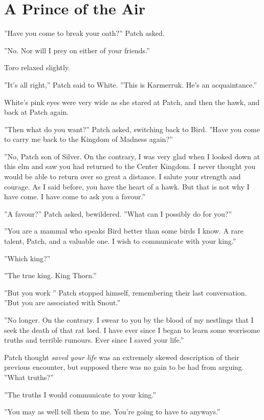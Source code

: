 \documentclass[12pt]{book}
\begin{document}
\section{A Prince of the Air}

 ''Have you come to break your oath?'' Patch asked.\par
 ''No. Nor will I prey on either of your friends.''\par
 Toro relaxed slightly.\par
 ''It's all right,'' Patch said to White. ''This is Karmerruk. He's %
 an acquaintance.''\par
 White's pink eyes were very wide as she stared at Patch, and then the hawk, and back at Patch again.\par
 ''Then what do you want?'' Patch asked, switching back to Bird. ''Have you come to carry me back to the Kingdom of Madness again?''\par
 ''No, Patch son of Silver. On the contrary, I was very glad when I looked down at this elm and saw you had returned to the Center Kingdom. I never thought you would be able to return over so great a distance. I salute your strength and courage. As I said before, you have the heart of a hawk. But that is not why I have come. I have come to ask you a favour.''\par
 ''A favour?'' Patch asked, bewildered. ''What can I possibly do for you?''\par
 ''You are a mammal who speaks Bird better than some birds I know. A rare talent, Patch, and a valuable one. I wish to communicate with your king.''\par
 ''Which king?''\par
 ''The true king. King Thorn.''\par
 ''But you work %
'' Patch stopped himself, remembering their last conversation. ''But you are associated with Snout.''\par
 ''No longer. On the contrary. I swear to you by the blood of my nestlings that I seek the death of that rat lord. I have ever since I began to learn some worrisome truths and terrible rumours. Ever since I saved your life.''\par
 Patch thought {\it saved your life} was an extremely skewed description of their previous encounter, but supposed there was no gain to be had from arguing. ''What truths?''\par
 ''The truths I would communicate to your king.''\par
 ''You may as well tell them to me. You're going to have to anyways.''\par
\end{document}

